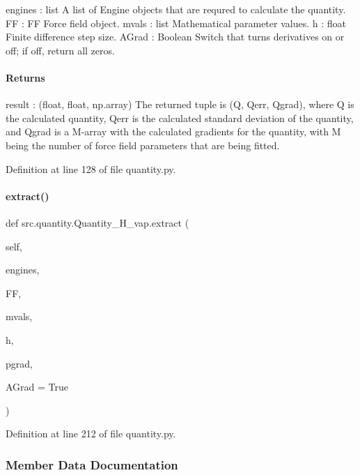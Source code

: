 engines \+: list A list of Engine objects that are requred to calculate the quantity. FF \+: FF Force field object. mvals \+: list Mathematical parameter values. h \+: float Finite difference step size. A\+Grad \+: Boolean Switch that turns derivatives on or off; if off, return all zeros.

\paragraph*{Returns }

result \+: (float, float, np.\+array) The returned tuple is (Q, Qerr, Qgrad), where Q is the calculated quantity, Qerr is the calculated standard deviation of the quantity, and Qgrad is a M-\/array with the calculated gradients for the quantity, with M being the number of force field parameters that are being fitted. 

Definition at line 128 of file quantity.\+py.

\mbox{\label{classsrc_1_1quantity_1_1Quantity__H__vap_a26a4bbb9c8e627928cb99e87c78e536c}} 
\paragraph{\texorpdfstring{extract()}{extract()}\hspace{0.1cm}{\footnotesize\ttfamily [2/2]}}
{\footnotesize\ttfamily def src.\+quantity.\+Quantity\+\_\+\+H\+\_\+vap.\+extract (\begin{DoxyParamCaption}\item[{}]{self,  }\item[{}]{engines,  }\item[{}]{FF,  }\item[{}]{mvals,  }\item[{}]{h,  }\item[{}]{pgrad,  }\item[{}]{A\+Grad = {\ttfamily True} }\end{DoxyParamCaption})}



Definition at line 212 of file quantity.\+py.



\subsubsection{Member Data Documentation}
\mbox{\label{classsrc_1_1quantity_1_1Quantity__H__vap_a8c1db25e3ee87b6e39ee094372615763}} 
